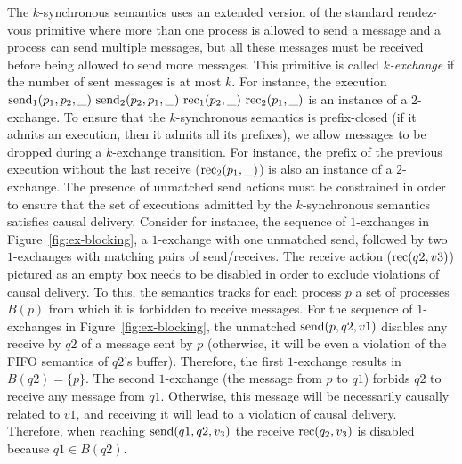 The $k$-synchronous semantics uses an extended version of the standard rendez-vous primitive where more than one process is allowed to send a message and a process can send multiple messages, but all these messages must be received before being allowed to send more messages. This primitive is called \emph{$k$-exchange} if the number of sent messages is at most $k$. For instance, the execution 
$
\send{1}{p_1,p_2,\_}\ 
\send{2}{p_2,p_1,\_}\ 
\rec{1}{p_2,\_}\ 
\rec{2}{p_1,\_} 
$
is an instance of a $2$-exchange. 
To ensure that the $k$-synchronous semantics is prefix-closed (if it admits an execution, then it admits all its prefixes), we allow messages to be dropped during a $k$-exchange transition. 
For instance, the prefix of the previous execution without the last receive ($\mathrm{rec}_{2}({p_1,\_})$) is also an instance of a $2$-exchange. The presence of unmatched send actions must be constrained in order to ensure that the set of executions admitted by the $k$-synchronous semantics satisfies causal delivery. Consider for instance, the sequence of $1$-exchanges in Figure~\ref{fig:ex-blocking}, a $1$-exchange with one unmatched send, followed by two $1$-exchanges with matching pairs of send/receives. The receive action ($\mathrm{rec}({q2,v3})$) pictured as an empty box needs to be disabled in order to exclude violations of causal delivery. To this, the semantics tracks for each process $p$ a set of processes $B(p)$ from which it is forbidden to receive messages. For the sequence of $1$-exchanges in Figure~\ref{fig:ex-blocking}, the unmatched $\mathrm{send}({p,q2,v1})$ disables any receive by $q2$ of a message sent by $p$ (otherwise, it will be even a violation of the FIFO semantics of $q2$'s buffer). Therefore, the first $1$-exchange results in $B(q2)=\{p\}$. The second $1$-exchange (the message from $p$ to $q1$) forbids $q2$ to receive any message from $q1$. Otherwise, this message will be necessarily causally related to $v1$, and receiving it will lead to a violation of causal delivery. Therefore, when reaching $\mathrm{send}({q1,q2,v_3})$ the receive $\mathrm{rec}({q_2,v_3})$ is disabled because $q1\in B(q2)$.


